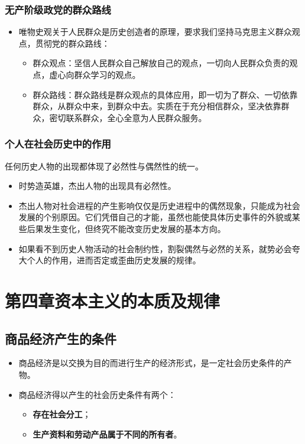 \documentclass[12pt,openany]{ctexbook}
\begin{document}
\subsection{无产阶级政党的群众路线}
\begin{itemize}
  \item 唯物史观关于人民群众是历史创造者的原理，要求我们坚持马克思主义群众观点，贯彻党的群众路线：
\begin{itemize}
  \item 群众观点：坚信人民群众自己解放自己的观点，一切向人民群众负责的观点，虚心向群众学习的观点。
  \item 群众路线：群众路线是群众观点的具体应用，即一切为了群众、一切依靠群众，从群众中来，到群众中去。实质在于充分相信群众，坚决依靠群众，密切联系群众，全心全意为人民群众服务。
\end{itemize}
\end{itemize}
\subsection{个人在社会历史中的作用}
任何历史人物的出现都体现了必然性与偶然性的统一。
\begin{itemize}
  \item 时势造英雄，杰出人物的出现具有必然性。
  \item 杰出人物对社会进程的产生影响仅仅是历史进程中的偶然现象，只能成为社会发展的个别原因。它们凭借自己的才能，虽然也能使具体历史事件的外貌或某些后果发生变化，但终究不能改变历史发展的基本方向。
  \item 如果看不到历史人物活动的社会制约性，割裂偶然与必然的关系，就势必会夸大个人的作用，进而否定或歪曲历史发展的规律。
\end{itemize}
\chapter{第四章\quad{}资本主义的本质及规律}
\section{商品经济产生的条件}
\begin{itemize}
  \item 商品经济是以交换为目的而进行生产的经济形式，是一定社会历史条件的产物。
  \item 商品经济得以产生的社会历史条件有两个：
\begin{itemize}
  \item \textbf{存在社会分工}；
  \item \textbf{生产资料和劳动产品属于不同的所有者}。
\end{itemize}
\end{itemize}
\end{document}
